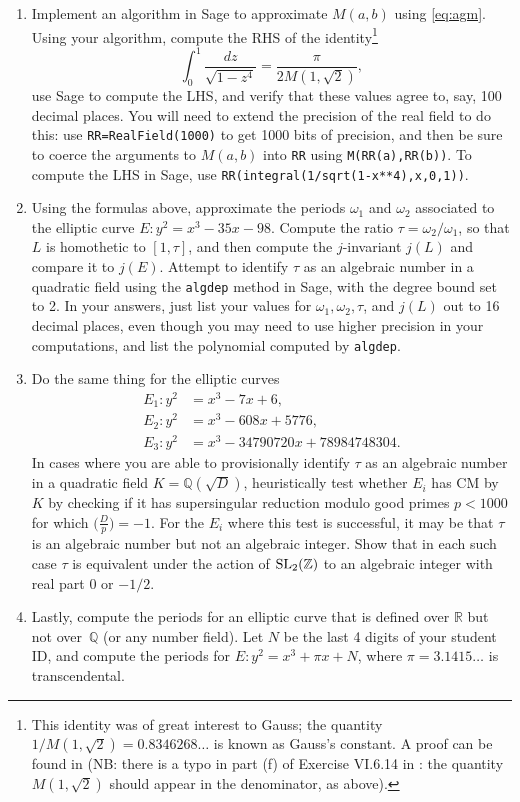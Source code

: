 \documentclass[11pt]{article}
\newcommand{\Q}{\mathbb{Q}}
\newcommand{\R}{\mathbb{R}}
\newcommand{\Z}{\mathbb{Z}}
\newcommand{\SL}{{\rm SL}}
\begin{document}
\begin{enumerate}[{\bf (a)}]
\item Implement an algorithm in Sage to approximate $M(a,b)$ using \eqref{eq:agm}.
Using your algorithm, compute the RHS of the identity\footnote{This identity was of great interest to Gauss; the quantity $1/M(1,\sqrt{2})=0.8346268\ldots$ is known as Gauss's constant.  A proof can be found in \cite[Ex.\ VI.6.12-14]{silverman} (NB: there is a typo in part (f) of Exercise VI.6.14 in \cite{silverman}: the quantity $M(1,\sqrt{2})$ should appear in the denominator, as above).}
\[
\int_0^1 \frac{dz}{\sqrt{1-z^4}} = \frac{\pi}{2M(1,\sqrt{2})},
\]
use Sage to compute the LHS, and verify that these values agree to, say, 100 decimal places.
You will need to extend the precision of the real field to do this: use \texttt{RR=RealField(1000)} to get 1000 bits of precision, and then be sure to coerce the arguments to $M(a,b)$ into \texttt{RR} using \texttt{M(RR(a),RR(b))}.
To compute the LHS in Sage, use \texttt{RR(integral(1/sqrt(1-x**4),x,0,1))}.

\item
Using the formulas above, approximate the periods $\omega_1$ and $\omega_2$ associated to the elliptic curve $E\colon y^2=x^3-35x-98$.
Compute the ratio $\tau = \omega_2/\omega_1$, so that $L$ is homothetic to $[1,\tau]$, and then compute the $j$-invariant $j(L)$ and compare it to $j(E)$.
Attempt to identify $\tau$ as an algebraic number in a quadratic field using the \texttt{algdep} method in Sage, with the degree bound set to 2.
In your answers, just list your values for $\omega_1,\omega_2,\tau$, and $j(L)$ out to 16 decimal places, even though you may need to use higher precision in your computations, and list the polynomial computed by \texttt{algdep}.

\item Do the same thing for the elliptic curves
\begin{align*}
E_1\colon y^2&=x^3-7x+6,\\
E_2\colon y^2&=x^3-608x+5776,\\
E_3\colon y^2 &= x^3 - 34790720x + 78984748304.
\end{align*}
In cases where you are able to provisionally identify $\tau$ as an algebraic number in a quadratic field $K=\Q(\sqrt{D})$, heuristically test whether $E_i$ has CM by $K$ by checking if it has supersingular reduction modulo good primes $p<1000$ for which $\bigl(\frac{D}{p}\bigr)=-1$.
For the $E_i$ where this test is successful, it may be that $\tau$ is an algebraic number but not an algebraic integer.
Show that in each such case $\tau$ is equivalent under the action of $\SL_2(\Z)$ to an algebraic integer with real part $0$ or $-1/2$.

\item Lastly, compute the periods for an elliptic curve that is defined over $\R$ but not over~$\Q$ (or any number field).
Let $N$ be the last 4 digits of your student ID, and compute the periods for $E\colon y^2 = x^3 + \pi x + N$,
where $\pi=3.1415\ldots$ is transcendental.
\end{enumerate}
\end{document}
